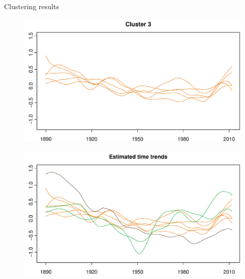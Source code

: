 \documentclass[10pt, handout]{beamer}
\begin{document}
\begin{frame}{Clustering results}
{\begin{figure}
  	\end{figure}}	
	{\onslide<4>
	\vspace{-69.45mm}
	\begin{figure}
    		\centering
    		\includegraphics[width=1\textwidth]{plots//VOC/cluster_3}
  	\end{figure}}	
	{\onslide<5->
	\vspace{-69.45mm}
	\begin{figure}
    		\centering
    		\includegraphics[width=1\textwidth]{plots//VOC/all_clusters}
  	\end{figure}}	
\end{frame}

\end{document}
